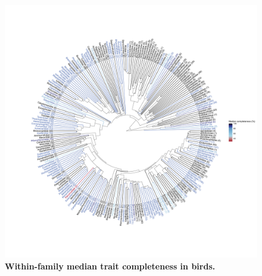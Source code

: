 \begin{landscape}
\begin{figure}[h!]
\centering
\includegraphics[scale=0.5,clip, trim=100 100 0 160]{Supporting/Chapter2/Figures/Phylogenies/Circular_birds_V2}
\caption[Within-family median trait completeness in birds]{\textbf{Within-family median trait completeness in birds.}}
\label{SI2_phybirds}
\end{figure}

\end{landscape}


\newpage
\pagebreak


